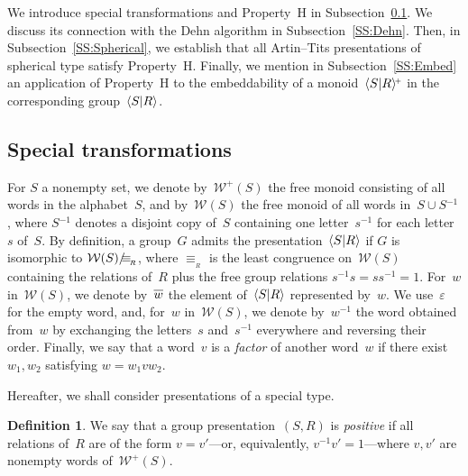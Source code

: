 \documentclass{amsart}
\numberwithin{equation}{section}
\theoremstyle{plain}
\theoremstyle{definition}
\newtheorem{defi}[prop]{Definition}
\begin{document}
We introduce special transformations and Property~${\mathrm{H}}$ in Subsection~\ref{SS:Special}. We discuss its connection with the Dehn algorithm in Subsection~\ref{SS:Dehn}. Then, in Subsection~\ref{SS:Spherical}, we establish that all Artin--Tits presentations of spherical type satisfy Property~${\mathrm{H}}$. Finally, we mention in Subsection~\ref{SS:Embed} an application of Property~${\mathrm{H}}$ to the embeddability of a monoid~${\langle{S}{\mid}\nobreak{R}\rangle^{\!\scriptscriptstyle+}}$ in the corresponding group~${\langle{S}{\mid}\nobreak{R}\rangle}$.

\subsection{Special transformations}
\label{SS:Special}

For ${S}$ a nonempty set, we denote by~${\mathcal{W}^{\scriptscriptstyle+}\!({S})}$ the free monoid consisting of all words in the alphabet~${S}$, and by~${\mathcal{W}({S})}$ the free monoid of all words in~${S} \cup {S}{^{-1}} $, where ${S}{^{-1}} $ denotes a disjoint copy of~${S}$ containing one letter~${s}{^{-1}} $ for each letter~${s}$ of~${S}$. By definition, a group~${G}$ admits the presentation~${\langle{S}{\mid}\nobreak{R}\rangle}$ if ${G}$ is isomorphic to ${\mathcal{W}({S})} {{/}\hspace{-0.7ex}} {\equiv_{{\!{}_{R}}}}$, where ${\equiv_{{\!{}_{R}}}}$ is the least congruence on~${\mathcal{W}({S})}$ containing the relations of~${R}$ plus the free group relations ${s}{^{-1}} {s} = {s} {s}{^{-1}} = 1$. For~${w}$ in~${\mathcal{W}({S})}$, we denote by~${\overline{\vrule width0pt height5pt{w}}}$ the element of~${\langle{S}{\mid}\nobreak{R}\rangle}$ represented by~${w}$. We use~${\varepsilon}$ for the empty word, and, for~${w}$ in~${\mathcal{W}({S})}$, we denote by~${w}{^{-1}}$ the word obtained from~${w}$ by exchanging the letters~${s}$ and~${s}{^{-1}}$ everywhere and reversing their order. Finally, we say that a word~${v}$ is a \emph{factor} of another word~${w}$ if there exist~${w}_1, {w}_2$ satisfying ${w} = {w}_1 {v} {w}_2$. 

Hereafter, we shall consider presentations of a special type.

\begin{defi}
We say that a group presentation~$({S}, {R})$ is \emph{positive} if all relations of~${R}$ are of the form ${v} = {v}'$---or, equivalently, ${v}{^{-1}} {v}' = 1$---where ${v}, {v}'$ are nonempty words of~${\mathcal{W}^{\scriptscriptstyle+}\!({S})}$. 
\end{defi}
\end{document}
